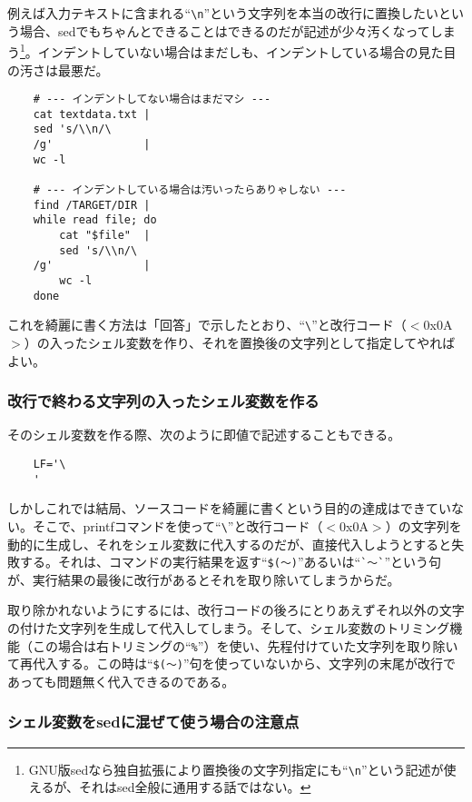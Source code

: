例えば入力テキストに含まれる``\verb|\n|''という文字列を本当の改行に置換したいという場合、sedでもちゃんとできることはできるのだが記述が少々汚くなってしまう\footnote{GNU版sedなら独自拡張により置換後の文字列指定にも``\verb|\n|''という記述が使えるが、それはsed全般に通用する話ではない。}。インデントしていない場合はまだしも、インデントしている場合の見た目の汚さは最悪だ。\\
\begin{frameboxit}{160.0mm}
\begin{verbatim}
	# --- インデントしてない場合はまだマシ ---
	cat textdata.txt |
	sed 's/\\n/\
	/g'              |
	wc -l

	# --- インデントしている場合は汚いったらありゃしない ---
	find /TARGET/DIR |
	while read file; do
	    cat "$file"  |
	    sed 's/\\n/\
	/g'              |
	    wc -l
	done
\end{verbatim}
\end{frameboxit}

これを綺麗に書く方法は「回答」で示したとおり、``\verb|\|''と改行コード（$<$0x0A$>$）の入ったシェル変数を作り、それを置換後の文字列として指定してやればよい。

\subsubsection*{改行で終わる文字列の入ったシェル変数を作る}

そのシェル変数を作る際、次のように即値で記述することもできる。
\begin{verbatim}
	LF='\
	'
\end{verbatim}

しかしこれでは結局、ソースコードを綺麗に書くという目的の達成はできていない。そこで、printfコマンドを使って``\verb|\|''と改行コード（$<$0x0A$>$）の文字列を動的に生成し、それをシェル変数に代入するのだが、直接代入しようとすると失敗する。それは、コマンドの実行結果を返す``\verb|$(～)|''あるいは``\verb|`～`|''という句が、実行結果の最後に改行があるとそれを取り除いてしまうからだ。

取り除かれないようにするには、改行コードの後ろにとりあえずそれ以外の文字の付けた文字列を生成して代入してしまう。そして、シェル変数のトリミング機能（この場合は右トリミングの``\verb|%|''）を使い、先程付けていた文字列を取り除いて再代入する。この時は``\verb|$(～)|''句を使っていないから、文字列の末尾が改行であっても問題無く代入できるのである。

\subsubsection*{シェル変数をsedに混ぜて使う場合の注意点}

